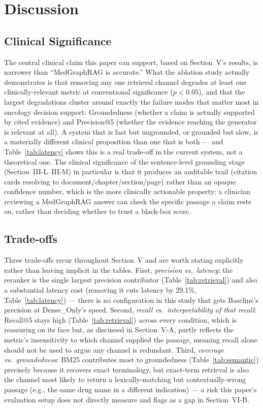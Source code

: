 \documentclass[conference]{IEEEtran}
\begin{document}
\section{Discussion}

\subsection{Clinical Significance}
The central clinical claim this paper can support, based on Section~V's results, is narrower than ``MedGraphRAG is accurate.'' What the ablation study actually demonstrates is that removing any one retrieval channel degrades at least one clinically-relevant metric at conventional significance ($p<0.05$), and that the largest degradations cluster around exactly the failure modes that matter most in oncology decision support: Groundedness (whether a claim is actually supported by cited evidence) and Precision@5 (whether the evidence reaching the generator is relevant at all). A system that is fast but ungrounded, or grounded but slow, is a materially different clinical proposition than one that is both --- and Table~\ref{tab:latency} shows this is a real trade-off in the current system, not a theoretical one. The clinical significance of the sentence-level grounding stage (Section~III-L--III-M) in particular is that it produces an auditable trail (citation cards resolving to document/chapter/section/page) rather than an opaque confidence number, which is the more clinically actionable property: a clinician reviewing a MedGraphRAG answer can check the specific passage a claim rests on, rather than deciding whether to trust a black-box score.

\subsection{Trade-offs}
Three trade-offs recur throughout Section~V and are worth stating explicitly rather than leaving implicit in the tables. First, \emph{precision vs.\ latency}: the reranker is the single largest precision contributor (Table~\ref{tab:retrieval}) and also a substantial latency cost (removing it cuts latency by 29.1\%, Table~\ref{tab:latency}) --- there is no configuration in this study that gets Baseline's precision at Dense\_Only's speed. Second, \emph{recall vs.\ interpretability of that recall}: Recall@5 stays high (Table~\ref{tab:retrieval}) across every condition, which is reassuring on its face but, as discussed in Section~V-A, partly reflects the metric's insensitivity to which channel supplied the passage, meaning recall alone should not be used to argue any channel is redundant. Third, \emph{coverage vs.\ groundedness}: BM25 contributes most to groundedness (Table~\ref{tab:semantic}) precisely because it recovers exact terminology, but exact-term retrieval is also the channel most likely to return a lexically-matching but contextually-wrong passage (e.g., the same drug name in a different indication) --- a risk this paper's evaluation setup does not directly measure and flags as a gap in Section~VI-B.
\end{document}
